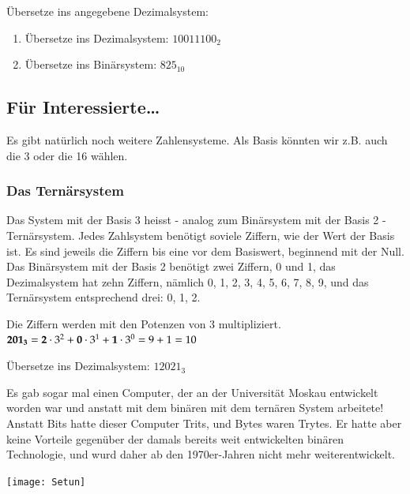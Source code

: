 \begin{exercise}
	Übersetze ins angegebene Dezimalsystem:
	\begin{enumerate}
		\item
			Übersetze ins Dezimalsystem: $10011100_{2}$
		\item
			Übersetze ins Binärsystem: $825_{10}$
	\end{enumerate}
\end{exercise}

\newpage

\subsection{Für Interessierte\ldots}
Es gibt natürlich noch weitere Zahlensysteme. Als Basis könnten wir z.B. auch die 3 oder die 16 wählen.

\subsubsection{Das Ternärsystem}
Das System mit der Basis 3 heisst - analog zum Binärsystem mit der Basis 2 - Ternärsystem. Jedes Zahlsystem benötigt soviele Ziffern, wie der Wert der Basis ist. Es sind jeweils die Ziffern bis eine vor dem Basiswert, beginnend mit der Null. Das Binärsystem mit der Basis 2 benötigt zwei Ziffern, 0 und 1, das Dezimalsystem hat zehn Ziffern, nämlich 0, 1, 2, 3, 4, 5, 6, 7, 8, 9, und das Ternärsystem entsprechend drei: 0, 1, 2.

\begin{example}
	Die Ziffern werden mit den Potenzen von 3 multipliziert.\\
	$\textbf{201\textsubscript{3}} = \textbf{2} \cdot 3^2 + \textbf{0} \cdot 3^1 + \textbf{1} \cdot 3^0 = 9 + 1 = 10$
\end{example}

\begin{exercise}
	Übersetze ins Dezimalsystem: $12021_{3}$
	\vfill
\end{exercise}

\begin{minipage}[t]{.5\linewidth}
	Es gab sogar mal einen Computer, der an der Universität Moskau entwickelt worden war und anstatt mit dem binären mit dem ternären System arbeitete! Anstatt Bits hatte dieser Computer Trits, und Bytes waren Trytes. Er hatte aber keine Vorteile gegenüber der damals bereits weit entwickelten binären Technologie, und wurd daher ab den 1970er-Jahren nicht mehr weiterentwickelt.
\end{minipage}
\hspace{.1\linewidth}
\begin{minipage}[t]{.4\linewidth}
	\vspace{-\ht\strutbox}
	\texttt{[image: Setun]}
\end{minipage}


